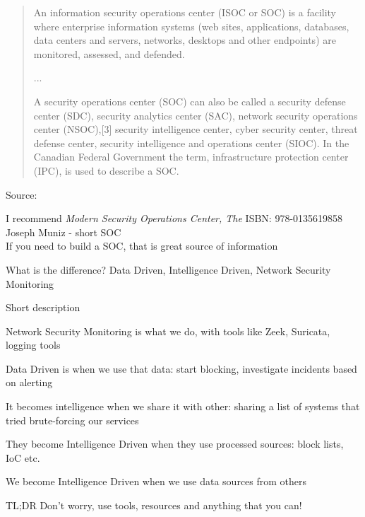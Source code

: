\documentclass[Screen16to9,17pt]{foils}
\begin{document}


\begin{quote}
An information security operations center (ISOC or SOC) is a facility where enterprise information systems (web sites, applications, databases, data centers and servers, networks, desktops and other endpoints) are monitored, assessed, and defended.

...

A security operations center (SOC) can also be called a security defense center (SDC), security analytics center (SAC), network security operations center (NSOC),[3] security intelligence center, cyber security center, threat defense center, security intelligence and operations center (SIOC). In the Canadian Federal Government the term, infrastructure protection center (IPC), is used to describe a SOC.
\end{quote}
Source: 

\begin{list2}
\item I recommend \emph{Modern Security Operations Center, The}
ISBN: 978-0135619858 Joseph Muniz - short SOC\\
If you need to build a SOC, that is great source of information
\end{list2}



What is the difference? Data Driven, Intelligence Driven, Network Security Monitoring

Short description
\begin{list2}
\item Network Security Monitoring is what we do, with tools like Zeek, Suricata, logging tools
\item Data Driven is when we use that data: start blocking, investigate incidents based on alerting
\item It becomes intelligence when we share it with other: sharing a list of systems that tried brute-forcing our services
\item They become Intelligence Driven when they use processed sources: block lists, IoC etc.
\item We become Intelligence Driven when we use data sources from others
\end{list2}

TL;DR Don't worry, use tools, resources and anything that you can!
\end{document}
